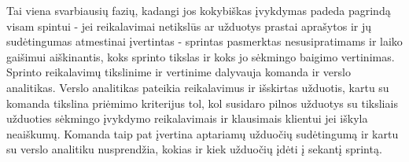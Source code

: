 \documentclass{VUMIFPSkursinis}
\begin{document}
	Tai viena svarbiausių fazių, kadangi jos kokybiškas įvykdymas padeda pagrindą visam spintui -  jei reikalavimai netikslūs ar užduotys prastai aprašytos ir jų sudėtingumas atmestinai įvertintas - sprintas pasmerktas nesusipratimams ir laiko gaišimui aiškinantis, koks sprinto tikslas ir koks jo sėkmingo baigimo vertinimas. Sprinto reikalavimų tikslinime ir vertinime dalyvauja komanda ir verslo analitikas. Verslo analitikas pateikia reikalavimus ir išskirtas užduotis, kartu su komanda tikslina priėmimo kriterijus tol, kol susidaro pilnos užduotys su tiksliais užduoties sėkmingo įvykdymo reikalavimais ir klausimais klientui jei iškyla neaiškumų. Komanda taip pat įvertina aptariamų užduočių sudėtingumą ir kartu su verslo analitiku nusprendžia, kokias ir kiek užduočių įdėti į sekantį sprintą.
\end{document}
